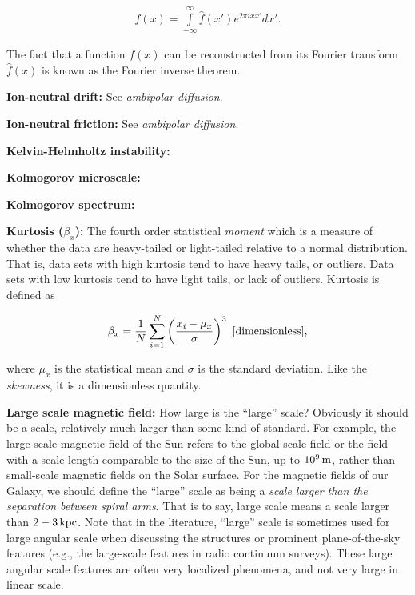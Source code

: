 \documentclass[a4paper,10pt]{article}
\begin{document}
\begin{align*}
    f(x) = \int\limits_{-\infty}^\infty \hat{f}(x')e^{2\pi ixx'}dx'.
\end{align*}

{\noindent}The fact that a function $f(x)$ can be reconstructed from its Fourier transform $\hat{f}(x)$ is known as the Fourier inverse theorem.

{\noindent}\textbf{Ion-neutral drift:} See \textit{ambipolar diffusion}.

{\noindent}\textbf{Ion-neutral friction:} See \textit{ambipolar diffusion}.

{\noindent}\textbf{Kelvin-Helmholtz instability:}

{\noindent}\textbf{Kolmogorov microscale:}

{\noindent}\textbf{Kolmogorov spectrum:}

{\noindent}\textbf{Kurtosis ($\beta_x$):} The fourth order statistical \textit{moment} which is a measure of whether the data are heavy-tailed or light-tailed relative to a normal distribution. That is, data sets with high kurtosis tend to have heavy tails, or outliers. Data sets with low kurtosis tend to have light tails, or lack of outliers. Kurtosis is defined as

\begin{align*}
    \beta_x = \frac{1}{N} \sum_{i=1}^N \left(\frac{x_i-\mu_x}{\sigma}\right)^3 ~ [{\rm dimensionless}],
\end{align*}

{\noindent}where $\mu_x$ is the statistical mean and $\sigma$ is the standard deviation. Like the \textit{skewness}, it is a dimensionless quantity.

{\noindent}\textbf{Large scale magnetic field:} How large is the ``large'' scale? Obviously it should be a scale, relatively much larger than some kind of standard. For example, the large-scale magnetic field of the Sun refers to the global scale field or the field with a scale length comparable to the size of the Sun, up to $10^9\,{\rm m}$, rather than small-scale magnetic fields on the Solar surface. For the magnetic fields of our Galaxy, we should define the ``large'' scale as being a \textit{scale larger than the separation between spiral arms}. That is to say, large scale means a scale larger than $2-3\,{\rm kpc}$. Note that in the literature, ``large'' scale is sometimes used for large angular scale when discussing the structures or prominent plane-of-the-sky features (e.g., the large-scale features in radio continuum surveys). These large angular scale features are often very localized phenomena, and not very large in linear scale.
\end{document}
